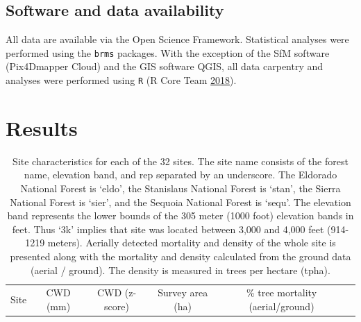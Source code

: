 \documentclass[twoside,12pt,final]{ucthesis-CA2012}
\begin{document}
\begin{ucmainmatter}
\subsection{Software and data
availability}\label{software-and-data-availability}

All data are available via the Open Science Framework. Statistical
analyses were performed using the \texttt{brms} packages. With the
exception of the SfM software (Pix4Dmapper Cloud) and the GIS software
QGIS, all data carpentry and analyses were performed using \texttt{R} (R
Core Team \protect\hyperlink{ref-rcoreteam2018}{2018}).

\section{Results}\label{results-1}
\begin{longtable}[]{@{}cccccc@{}}
\caption{Site characteristics for each of the 32 sites. The site name
consists of the forest name, elevation band, and rep separated by an
underscore. The Eldorado National Forest is `eldo', the Stanislaus
National Forest is `stan', the Sierra National Forest is `sier', and the
Sequoia National Forest is `sequ'. The elevation band represents the
lower bounds of the 305 meter (1000 foot) elevation bands in feet. Thus
`3k' implies that site was located between 3,000 and 4,000 feet
(914-1219 meters). Aerially detected mortality and density of the whole
site is presented along with the mortality and density calculated from
the ground data (aerial / ground). The density is measured in trees per
hectare (tpha).}\tabularnewline
\toprule
\begin{minipage}[b]{0.11\columnwidth}\centering\strut
Site\strut
\end{minipage} & \begin{minipage}[b]{0.07\columnwidth}\centering\strut
CWD (mm)\strut
\end{minipage} & \begin{minipage}[b]{0.11\columnwidth}\centering\strut
CWD (z-score)\strut
\end{minipage} & \begin{minipage}[b]{0.13\columnwidth}\centering\strut
Survey area (ha)\strut
\end{minipage} & \begin{minipage}[b]{0.18\columnwidth}\centering\strut
\% tree mortality (aerial/ground)\strut
\end{minipage} & \begin{minipage}[b]{0.22\columnwidth}\centering\strut

\end{minipage}
\end{longtable}
\end{ucmainmatter}
\end{document}
